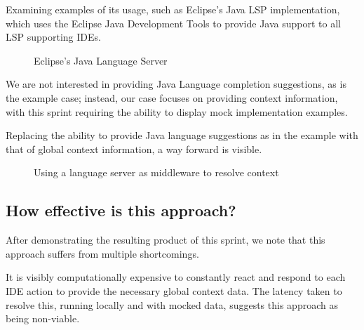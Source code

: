 Examining examples of its usage, such as Eclipse's Java LSP implementation, which uses the Eclipse Java Development Tools to provide Java support to all LSP supporting IDEs.

\begin{figure}[h!]
	
	
	\caption{Eclipse's Java Language Server}
	
\end{figure}

We are not interested in providing Java Language completion suggestions, as is the example case; instead, our case focuses on providing context information, with this sprint requiring the ability to display mock implementation examples.

Replacing the ability to provide Java language suggestions as in the example with that of global context information, a way forward is visible.

\begin{figure}[h!]
	
	\caption{Using a language server as middleware to resolve context}
\end{figure}



\subsection{How effective is this approach?}

After demonstrating the resulting product of this sprint, we note that this approach suffers from multiple shortcomings.

It is visibly computationally expensive to constantly react and respond to each IDE action to provide the necessary global context data. The latency taken to resolve this, running locally and with mocked data, suggests this approach as being non-viable. 

